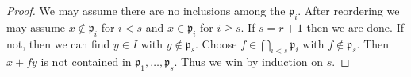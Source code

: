 \documentclass[10pt,a4paper]{amsart}
\theoremstyle{plain}
\theoremstyle{definition}
\theoremstyle{remark}
\numberwithin{equation}{subsection}
\begin{document}
\begin{proof}
We may assume there are no inclusions among the $\mathfrak p_i$.
After reordering we may assume $x \not \in \mathfrak p_i$ for $i < s$
and $x \in \mathfrak p_i$ for $i \geq s$. If $s = r + 1$ then we are done.
If not, then we can find $y \in I$ with $y \not \in \mathfrak p_s$.
Choose $f \in \bigcap_{i < s} \mathfrak p_i$ with $f \not \in \mathfrak p_s$.
Then $x + fy$ is not contained in $\mathfrak p_1, \ldots, \mathfrak p_s$.
Thus we win by induction on $s$.
\end{proof}
\end{document}
